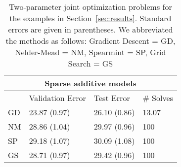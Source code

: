 \documentclass[12pt,letterpaper]{article}
\begin{document}
\begin{table}
	\caption {\label{tab:two_params} Two-parameter joint optimization problems for the examples in Section~\ref{sec:results}. Standard errors are given in parentheses. We abbreviated the methods as follows: Gradient Descent = GD, Nelder-Mead = NM, Spearmint = SP, Grid Search = GS}
	\centering
	\begin{tabular}{| l | l | l | l | }
	\hline
	\multicolumn{4}{|c|}{Sparse additive models}\\
	\hline
	& Validation Error & Test Error & \# Solves\\
	\hline
	GD & 23.87 (0.97) & 26.10 (0.86) & 13.07 \\
	\hline
	NM & 28.86 (1.04) & 29.97 (0.96) & 100 \\
	\hline
	SP & 29.18 (1.07) & 30.09 (1.08) & 100 \\
	\hline
	GS & 28.71 (0.97) & 29.42 (0.96) & 100 \\
	\hline
	\end{tabular}

	\vspace{0.5cm}


\end{table}
\end{document}
